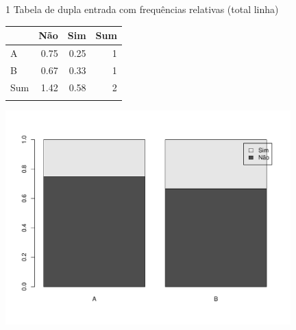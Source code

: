 \documentclass[
  ignorenonframetext,
  serif,
  professionalfont,
  usenames,
  dvipsnames,
  aspectratio = 169]{beamer}
\def\beginAThirdColumn{\begin{minipage}{0.31\textwidth}}%
\def\beginTwoThirdsColumn{\begin{minipage}{0.64\textwidth}}%
\def\endColumns{\end{minipage}}%
\begin{document}
\begin{frame}{1 Tabela de dupla entrada com frequências relativas (total
linha)}
\label{tabela-de-dupla-entrada-com-frequuxeancias-relativas-total-linha}
\beginAThirdColumn

\begin{longtable}[]{@{}lrrr@{}}
\toprule\noalign{}
& Não & Sim & Sum \\
\midrule\noalign{}
\endhead
A & 0.75 & 0.25 & 1 \\
B & 0.67 & 0.33 & 1 \\
Sum & 1.42 & 0.58 & 2 \\
\bottomrule\noalign{}
\end{longtable}

\endColumns
\beginTwoThirdsColumn

\begin{center}\includegraphics[width=11cm]{exercicios-encontro2-solucao_files/figure-beamer/unnamed-chunk-20-1} \end{center}

\endColumns
\end{frame}
\end{document}
